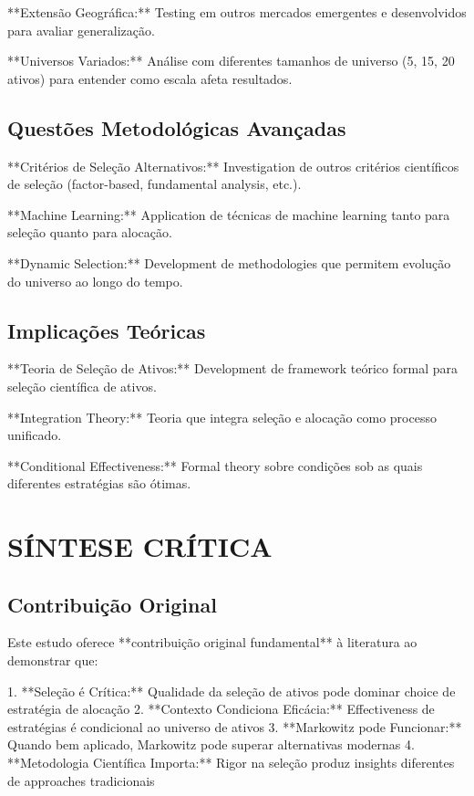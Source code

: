 **Extensão Geográfica:** Testing em outros mercados emergentes e desenvolvidos para avaliar generalização.

**Universos Variados:** Análise com diferentes tamanhos de universo (5, 15, 20 ativos) para entender como escala afeta resultados.

\subsection{Questões Metodológicas Avançadas}

**Critérios de Seleção Alternativos:** Investigation de outros critérios científicos de seleção (factor-based, fundamental analysis, etc.).

**Machine Learning:** Application de técnicas de machine learning tanto para seleção quanto para alocação.

**Dynamic Selection:** Development de methodologies que permitem evolução do universo ao longo do tempo.

\subsection{Implicações Teóricas}

**Teoria de Seleção de Ativos:** Development de framework teórico formal para seleção científica de ativos.

**Integration Theory:** Teoria que integra seleção e alocação como processo unificado.

**Conditional Effectiveness:** Formal theory sobre condições sob as quais diferentes estratégias são ótimas.

\section{SÍNTESE CRÍTICA}

\subsection{Contribuição Original}

Este estudo oferece **contribuição original fundamental** à literatura ao demonstrar que:

1. **Seleção é Crítica:** Qualidade da seleção de ativos pode dominar choice de estratégia de alocação
2. **Contexto Condiciona Eficácia:** Effectiveness de estratégias é condicional ao universo de ativos
3. **Markowitz pode Funcionar:** Quando bem aplicado, Markowitz pode superar alternativas modernas
4. **Metodologia Científica Importa:** Rigor na seleção produz insights diferentes de approaches tradicionais

